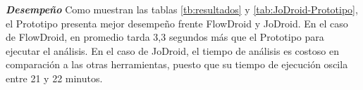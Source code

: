 % 

\textbf{\textit{Desempeño}}\newline 
Como muestran las tablas \ref{tb:resultados} y \ref{tab:JoDroid-Prototipo}, el
Prototipo presenta mejor desempeño frente FlowDroid y JoDroid. En el caso de
FlowDroid, en promedio tarda 3,3 segundos más que el Prototipo para ejecutar el
análisis. En el caso de JoDroid, el tiempo de análisis es costoso en comparación
a las otras herramientas, puesto que su tiempo de ejecución oscila entre 21 y 22
minutos.\newline

